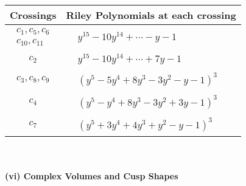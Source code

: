 \documentclass[1p]{elsarticle_modified}
\theoremstyle{definition}
\begin{document}
\begin{tabular}{m{50pt}|m{274pt}}
Crossings & \hspace{64pt}Riley Polynomials at each crossing \\
\hline $$\begin{aligned}c_{1},c_{5},c_{6}\\c_{10},c_{11}\end{aligned}$$&$\begin{aligned}
&y^{15}-10 y^{14}+\cdots- y-1
\end{aligned}$\\
\hline $$\begin{aligned}c_{2}\end{aligned}$$&$\begin{aligned}
&y^{15}-10 y^{14}+\cdots+7 y-1
\end{aligned}$\\
\hline $$\begin{aligned}c_{3},c_{8},c_{9}\end{aligned}$$&$\begin{aligned}
&(y^5-5 y^4+8 y^3-3 y^2- y-1)^3
\end{aligned}$\\
\hline $$\begin{aligned}c_{4}\end{aligned}$$&$\begin{aligned}
&(y^5- y^4+8 y^3-3 y^2+3 y-1)^3
\end{aligned}$\\
\hline $$\begin{aligned}c_{7}\end{aligned}$$&$\begin{aligned}
&(y^5+3 y^4+4 y^3+y^2- y-1)^3
\end{aligned}$\\
\hline
\end{tabular}\\~\\
\newpage\flushleft \textbf{(vi) Complex Volumes and Cusp Shapes}
\end{document}
